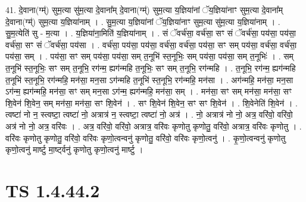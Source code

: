 \documentclass[17pt]{extarticle}
\begin{document}
41. दे॒वाना(ग्म्॑) सुम॒त्या सु॑म॒त्या दे॒वाना᳚म् दे॒वाना(ग्म्॑) सुम॒त्या य॒ज्ञिया॑नां ॅय॒ज्ञिया॑नाꣳ सुम॒त्या दे॒वाना᳚म् दे॒वाना(ग्म्॑) सुम॒त्या य॒ज्ञिया॑नाम् । . सु॒म॒त्या य॒ज्ञिया॑नां ॅय॒ज्ञिया॑नाꣳ सुम॒त्या सु॑म॒त्या य॒ज्ञिया॑नाम् । . सु॒म॒त्येति॑ सु - म॒त्या । . य॒ज्ञिया॑ना॒मिति॑ य॒ज्ञिया॑नाम् । . सं ॅवर्च॑सा॒ वर्च॑सा॒ सꣳ सं ॅवर्च॑सा॒ पय॑सा॒ पय॑सा॒ वर्च॑सा॒ सꣳ सं ॅवर्च॑सा॒ पय॑सा । . वर्च॑सा॒ पय॑सा॒ पय॑सा॒ वर्च॑सा॒ वर्च॑सा॒ पय॑सा॒ सꣳ सम् पय॑सा॒ वर्च॑सा॒ वर्च॑सा॒ पय॑सा॒ सम् । . पय॑सा॒ सꣳ सम् पय॑सा॒ पय॑सा॒ सम् त॒नूभि॑ स्त॒नूभिः॒ सम् पय॑सा॒ पय॑सा॒ सम् त॒नूभिः॑ । . सम् त॒नूभि॑ स्त॒नूभिः॒ सꣳ सम् त॒नूभि॒ रग॑न्म॒ ह्यग॑न्महि त॒नूभिः॒ सꣳ सम् त॒नूभि॒ रग॑न्महि । . त॒नूभि॒ रग॑न्म॒ ह्यग॑न्महि त॒नूभि॑ स्त॒नूभि॒ रग॑न्महि॒ मन॑सा॒ मन॒सा ऽग॑न्महि त॒नूभि॑ स्त॒नूभि॒ रग॑न्महि॒ मन॑सा । . अग॑न्महि॒ मन॑सा॒ मन॒सा ऽग॑न्म॒ ह्यग॑न्महि॒ मन॑सा॒ सꣳ सम् मन॒सा ऽग॑न्म॒ ह्यग॑न्महि॒ मन॑सा॒ सम् । . मन॑सा॒ सꣳ सम् मन॑सा॒ मन॑सा॒ सꣳ शि॒वेन॑ शि॒वेन॒ सम् मन॑सा॒ मन॑सा॒ सꣳ शि॒वेन॑ । . सꣳ शि॒वेन॑ शि॒वेन॒ सꣳ सꣳ शि॒वेन॑ । . शि॒वेनेति॑ शि॒वेन॑ । . त्वष्टा॑ नो न॒ स्त्वष्टा॒ त्वष्टा॑ नो॒ अत्रात्र॑ न॒ स्त्वष्टा॒ त्वष्टा॑ नो॒ अत्र॑ । . नो॒ अत्रात्र॑ नो नो॒ अत्र॒ वरि॑वो॒ वरि॑वो॒ अत्र॑ नो नो॒ अत्र॒ वरि॑वः । . अत्र॒ वरि॑वो॒ वरि॑वो॒ अत्रात्र॒ वरि॑वः कृणोतु कृणोतु॒ वरि॑वो॒ अत्रात्र॒ वरि॑वः कृणोतु । . वरि॑वः कृणोतु कृणोतु॒ वरि॑वो॒ वरि॑वः कृणो॒त्वन्वनु॑ कृणोतु॒ वरि॑वो॒ वरि॑वः कृणो॒त्वनु॑ । . कृ॒णो॒त्वन्वनु॑ कृणोतु कृणो॒त्वनु॑ मार्ष्टु मा॒र्ष्ट्वनु॑ कृणोतु कृणो॒त्वनु॑ मार्ष्टु । \newline
\pagebreak
{}

\section{ TS 1.4.44.2 }
\end{document}
